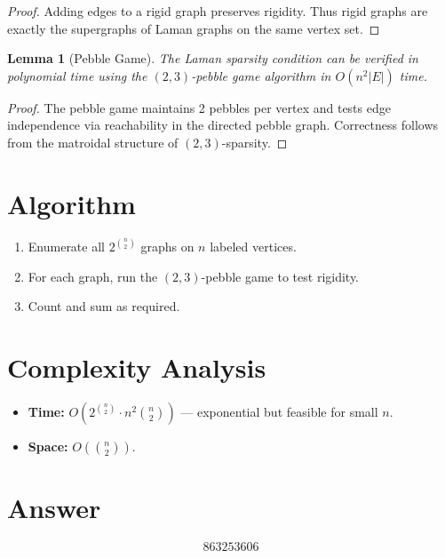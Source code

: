\documentclass[11pt]{article}
\newtheorem{lemma}[theorem]{Lemma}
\begin{document}
\begin{proof}
Adding edges to a rigid graph preserves rigidity. Thus rigid graphs are exactly the supergraphs of Laman graphs on the same vertex set.
\end{proof}

\begin{lemma}[Pebble Game]
The Laman sparsity condition can be verified in polynomial time using the $(2,3)$-pebble game algorithm in $O(n^2 |E|)$ time.
\end{lemma}

\begin{proof}
The pebble game maintains 2 pebbles per vertex and tests edge independence via reachability in the directed pebble graph. Correctness follows from the matroidal structure of $(2,3)$-sparsity.
\end{proof}

\section{Algorithm}
\begin{enumerate}
    \item Enumerate all $2^{\binom{n}{2}}$ graphs on $n$ labeled vertices.
    \item For each graph, run the $(2,3)$-pebble game to test rigidity.
    \item Count and sum as required.
\end{enumerate}

\section{Complexity Analysis}
\begin{itemize}
    \item \textbf{Time:} $O\!\left(2^{\binom{n}{2}} \cdot n^2 \binom{n}{2}\right)$ --- exponential but feasible for small $n$.
    \item \textbf{Space:} $O\!\left(\binom{n}{2}\right)$.
\end{itemize}

\section{Answer}

\[
\boxed{863253606}
\]
\end{document}
